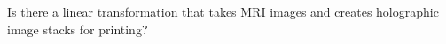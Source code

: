 Is there a linear transformation that takes MRI images and creates holographic image stacks for printing?
